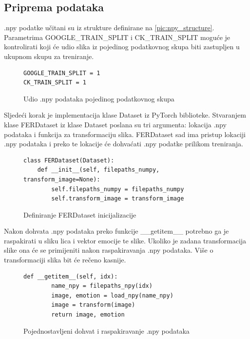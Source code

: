 \documentclass[times, utf8, zavrsni,numeric,pstricks]{fer}
\begin{document}
\subsection{Priprema podataka}
.npy podatke učitani su iz strukture definirane na \ref{pic:npy_structure}. Parametrima GOOGLE\_TRAIN\_SPLIT i CK\_TRAIN\_SPLIT moguće je kontrolirati koji će udio slika iz pojedinog podatkovnog skupa biti zastupljen u ukupnom skupu za treniranje.

\begin{figure}[H]
\centering
\begin{Verbatim}[fontsize=\small]
GOOGLE_TRAIN_SPLIT = 1
CK_TRAIN_SPLIT = 1
\end{Verbatim}
\caption{Udio .npy podataka pojedinog podatkovnog skupa}
\label{pic:split_dataset}
\end{figure}
\noindent
Sljedeći korak je implementacija klase Dataset iz PyTorch biblioteke. Stvaranjem klase FERDataset iz klase Dataset poslana su tri argumenta: lokacija .npy podataka i funkcija za transformaciju slika. FERDataset sad ima pristup lokaciji .npy podataka i preko te lokacije će dohvaćati .npy podatke prilikom treniranja.


\begin{figure}[H]
\centering

\begin{Verbatim}[fontsize=\small]
class FERDataset(Dataset):
    def __init__(self, filepaths_numpy, transform_image=None):
        self.filepaths_numpy = filepaths_numpy
        self.transform_image = transform_image
\end{Verbatim}
\caption{Definiranje FERDataset inicijalizacije}
\label{pic:init_dataset}

\end{figure}

\noindent
Nakon dohvata .npy podataka preko funkcije \_\_getitem\_\_ potrebno ga je raspakirati u sliku lica i vektor emocije te slike. Ukoliko je zadana transformacija slike ona će se primijeniti nakon raspakiravanja .npy podataka. Više o transformaciji slika bit će rečeno kasnije. 

\begin{figure}[H]
\centering

\begin{Verbatim}[fontsize=\small]
def __getitem__(self, idx):
        name_npy = filepaths_npy(idx)
        image, emotion = load_npy(name_npy)
        image = transform(image)
        return image, emotion
\end{Verbatim}
\caption{Pojednostavljeni dohvat i raspakiravanje .npy podataka}
\label{pic:init_dataset}
\end{figure}
\end{document}

